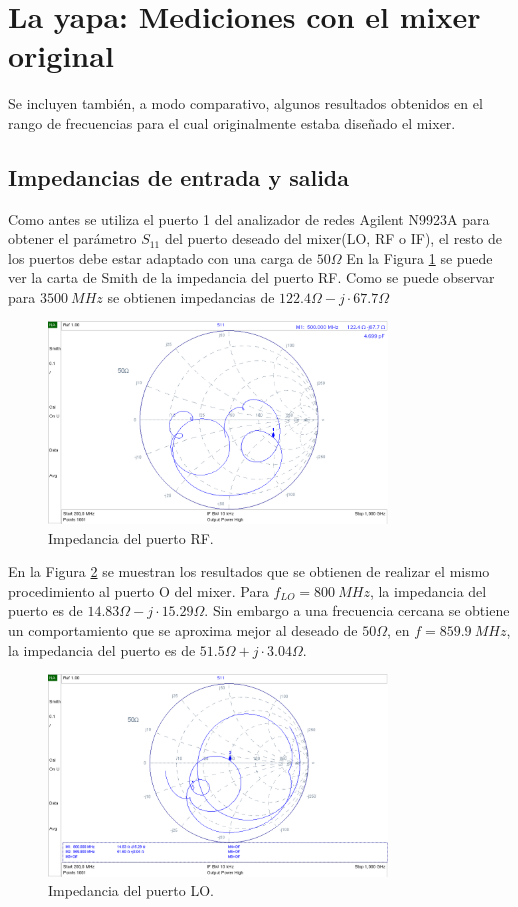 \documentclass[a4paper,10pt]{article}
\title{  }
\begin{document}
\section{La yapa: Mediciones con el mixer original}
	Se incluyen tambi\'en, a modo comparativo, algunos resultados obtenidos en el rango de frecuencias para el cual originalmente estaba dise\~nado el mixer.
	\subsection{Impedancias de entrada y salida}
	\indent Como antes se utiliza el puerto 1 del analizador de redes Agilent N9923A para obtener el par\'ametro $S_{11}$ del puerto deseado del mixer(LO, RF o IF), el resto de los puertos debe estar adaptado con una carga de $50\Omega$
	\indent En la Figura \ref{impedancia1fran} se puede ver la carta de Smith 
	de la impedancia del puerto RF. Como se puede observar para $3500~MHz$ se obtienen impedancias de $122.4\Omega-j\cdot67.7\Omega$
	
	\begin{figure}[!htb]
		\centering
		\includegraphics[width=9cm]{Images/impRFvieja.png}
		\caption{Impedancia del puerto RF.}
		\label{impedancia1fran}
	\end{figure}
	
	\indent En la Figura \ref{impedancia2fran} se muestran los resultados que se obtienen de realizar el mismo procedimiento al puerto O del mixer. 
	Para $f_{LO}=800~MHz$, la impedancia del puerto es de 
	$14.83\Omega-j\cdot15.29\Omega$. Sin embargo a una frecuencia cercana se obtiene un comportamiento que se aproxima mejor al deseado de $50\Omega$, en $f=859.9~MHz$, la impedancia del puerto es de $51.5\Omega+j\cdot3.04\Omega$.
	
	\begin{figure}[!htb]
		\centering
		\includegraphics[width=9cm]{Images/impLOvieja.png}
		\caption{Impedancia del puerto LO.}
		\label{impedancia2fran}		
	\end{figure}
\end{document}
